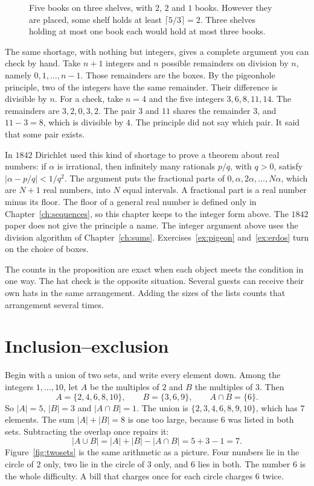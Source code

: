 \begin{figure}[ht]
\centering
{}
\caption{Five books on three shelves, with $2$, $2$ and $1$ books. However they are placed, some shelf holds at least $\lceil 5/3\rceil=2$. Three shelves holding at most one book each would hold at most three books.}
\label{fig:pigeon}
\end{figure}

The same shortage, with nothing but integers, gives a complete argument you can check by hand. Take $n+1$ integers and $n$ possible remainders on division by $n$, namely $0,1,\dots,n-1$. Those remainders are the boxes. By the pigeonhole principle, two of the integers have the same remainder. Their difference is divisible by $n$. For a check, take $n=4$ and the five integers $3,6,8,11,14$. The remainders are $3,2,0,3,2$. The pair $3$ and $11$ shares the remainder $3$, and $11-3=8$, which is divisible by $4$. The principle did not say which pair. It said that some pair exists.


In $1842$ Dirichlet used this kind of shortage to prove a theorem about real numbers: if $\alpha$ is irrational, then infinitely many rationals $p/q$, with $q>0$, satisfy $\bigl|\alpha-p/q\bigr|<1/q^2$. The argument puts the fractional parts of $0,\alpha,2\alpha,\dots,N\alpha$, which are $N+1$ real numbers, into $N$ equal intervals. A fractional part is a real number minus its floor. The floor of a general real number is defined only in Chapter~\ref{ch:sequences}, so this chapter keeps to the integer form above. The $1842$ paper does not give the principle a name. The integer argument above uses the division algorithm of Chapter~\ref{ch:sums}. Exercises~\ref{ex:pigeon} and~\ref{ex:erdos} turn on the choice of boxes.

The counts in the proposition are exact when each object meets the condition in one way. The hat check is the opposite situation. Several guests can receive their own hats in the same arrangement. Adding the sizes of the lists counts that arrangement several times.

\section{Inclusion--exclusion}

Begin with a union of two sets, and write every element down. Among the integers $1,\dots,10$, let $A$ be the multiples of $2$ and $B$ the multiples of $3$. Then
\[
A=\{2,4,6,8,10\},\qquad B=\{3,6,9\},\qquad A\cap B=\{6\}.
\]
So $|A|=5$, $|B|=3$ and $|A\cap B|=1$. The union is $\{2,3,4,6,8,9,10\}$, which has $7$ elements. The sum $|A|+|B|=8$ is one too large, because $6$ was listed in both sets. Subtracting the overlap once repairs it:
\[
|A\cup B|=|A|+|B|-|A\cap B|=5+3-1=7.
\]
Figure~\ref{fig:twosets} is the same arithmetic as a picture. Four numbers lie in the circle of $2$ only, two lie in the circle of $3$ only, and $6$ lies in both. The number $6$ is the whole difficulty. A bill that charges once for each circle charges $6$ twice.


